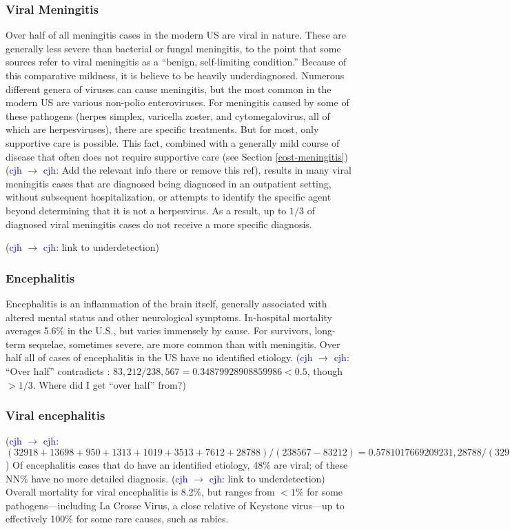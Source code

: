 \documentclass[12pt]{article}
\newcommand{\cjh}{\textcolor{blue}{cjh}}
\newcommand{\msg}[3]{(#1 $\rightarrow$ #2: #3)}
\newcommand{\mcc}[1]{\msg\cjh\cjh{#1}}
\begin{document}
        \subsubsection{Viral Meningitis}
            \label{viral-meningitis}
            Over half of all meningitis cases in the modern US are viral in nature. These are generally less severe than bacterial or fungal meningitis, to the point that some sources refer to viral meningitis as a ``benign, self-limiting condition.''\cite{asdf} Because of this comparative mildness, it is believe to be heavily underdiagnosed. Numerous different genera of viruses can cause meningitis, but the most common in the modern US are various non-polio enteroviruses. For meningitis caused by some of these pathogens (herpes simplex, varicella zoster, and cytomegalovirus, all of which are herpesviruses), there are specific treatments. But for most, only supportive care is possible. This fact, combined with a generally mild course of disease that often does not require supportive care (see Section \ref{cost-meningitis})\mcc{Add the relevant info there or remove this ref}, results in many viral meningitis cases that are diagnosed being diagnosed in an outpatient setting, without subsequent hospitalization, or attempts to identify the specific agent beyond determining that it is not a herpesvirus. As a result, up to $1/3$ of diagnosed viral meningitis cases do not receive a more specific diagnosis.

            \mcc{link to underdetection}

        \subsubsection{Encephalitis}
            \label{encephalitis}

            Encephalitis is an inflammation of the brain itself, generally associated with altered mental status and other neurological symptoms. In-hospital mortality averages 5.6\% in the U.S., but varies immensely by cause. For survivors, long-term sequelae, sometimes severe, are more common than with meningitis. Over half all of cases of encephalitis in the US have no identified etiology.
            \mcc{``Over half'' contradicts \cite{george2014encephalitis}: $83,212/238,567=0.34879928908859986< 0.5$, though $> 1/3$. Where did I get ``over half'' from?}
            
        \subsubsection{Viral encephalitis}
            \label{viral-encephalitis}
            \mcc{$(32918+13698+950+1313+1019+3513+7612+28788)/(238567-83212) = 0.5781017669209231, 28788/(32918+13698+950+1313+1019+3513+7612+28788) = 0.32053980024718576$}
            Of encephalitis cases that do have an identified etiology, 48\% are viral; of these NN\% have no more detailed diagnosis. \mcc{link to underdetection} Overall mortality for viral encephalitis is 8.2\%, but ranges from $<1\%$ for some pathogens---including La Crosse Virus, a close relative of Keystone virus---up to effectively 100\% for some rare causes, such as rabies.
\end{document}
